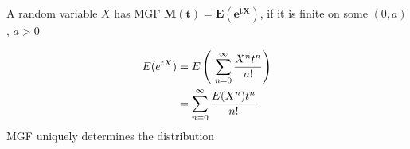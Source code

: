 
\begin{slide}
\begin{shaded}
\noindent{}A random variable $X$ has MGF $\mathbf{M(t) = E(e^{tX})}$, if it is finite on some $(0,a)$, $a>0$
\end{shaded}
\begin{align*}
  E(e^{tX})&= E\left(\ \sum_{n=0}^{\infty} {X^nt^n \over n!}\right) \\&= \sum_{n=0}^{\infty} {E(X^n) t^n \over n!}
\end{align*}
MGF uniquely determines the distribution
\end{slide}
